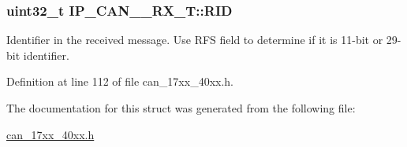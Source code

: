 \subsubsection[{\texorpdfstring{R\+ID}{RID}}]{ uint32\+\_\+t I\+P\+\_\+\+C\+A\+N\+\_\+\_\+\+R\+X\+\_\+\+T\+::\+R\+ID}\hypertarget{structIP__CAN__001__RX__T_a9b8287992a2f69010823997db04d7ef6}{}\label{structIP__CAN__001__RX__T_a9b8287992a2f69010823997db04d7ef6}
Identifier in the received message. Use R\+FS field to determine if it is 11-\/bit or 29-\/bit identifier. 

Definition at line 112 of file can\+\_\+17xx\+\_\+40xx.\+h.



The documentation for this struct was generated from the following file\+:\begin{DoxyCompactItemize}
\item 
\hyperlink{can__17xx__40xx_8h}{can\+\_\+17xx\+\_\+40xx.\+h}\end{DoxyCompactItemize}
